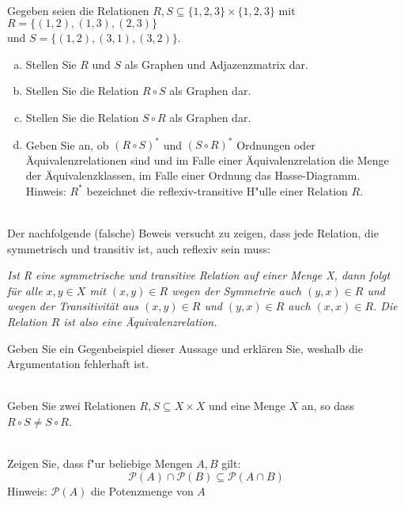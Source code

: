 \\
Gegeben seien die Relationen $R,S\subseteq\{1,2,3\}\times\{1,2,3\}$ mit $R=\{(1,2),(1,3),(2,3)\}$\\und $S=\{(1,2),(3,1),(3,2)\}$.
\begin{enumerate}[(a)]
    \item Stellen Sie $R$ und $S$ als Graphen und Adjazenzmatrix dar.
    \item Stellen Sie die Relation $R\circ S$ als Graphen dar.
    \item Stellen Sie die Relation $S\circ R$ als Graphen dar.
    \item Geben Sie an, ob $(R\circ S)^*$ und $(S\circ R)^*$ Ordnungen oder Äquivalenzrelationen sind und im Falle einer Äquivalenzrelation die Menge der Äquivalenzklassen, im Falle einer Ordnung das Hasse-Diagramm.\\
    Hinweis: $R^*$ bezeichnet die reflexiv-transitive H"ulle einer Relation $R$.

\end{enumerate}

\\
Der nachfolgende (falsche) Beweis versucht zu zeigen, dass jede Relation, die symmetrisch und transitiv ist, auch reflexiv sein muss: 

\textit{Ist R eine symmetrische und transitive Relation auf einer Menge X, dann folgt für alle $x,y\in X$ mit $(x,y)\in R$ wegen der Symmetrie auch $(y,x)\in R$ und wegen der Transitivität aus $(x,y)\in R$ und $(y,x)\in R$ auch $(x,x)\in R$. Die Relation $R$ ist also eine Äquivalenzrelation.}

Geben Sie ein Gegenbeispiel dieser Aussage und erklären Sie, weshalb die Argumentation fehlerhaft ist.

\\
Geben Sie zwei Relationen $R,S\subseteq X\times X$ und eine Menge $X$ an, so dass $R\circ S\neq S\circ R$.

\\
Zeigen Sie, dass f"ur beliebige Mengen $A,B$ gilt: \[\mathscr{P}(A)\cap\mathscr{P}(B)\subseteq\mathscr{P}(A\cap B)\]
Hinweis: $\mathscr{P}(A)$ die Potenzmenge von $A$

